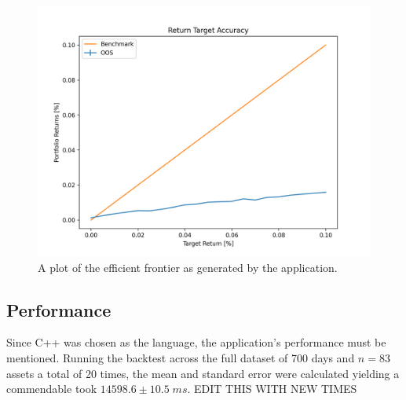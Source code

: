 \documentclass{article}
\begin{document}
\begin{figure}[H]
	\centerline{\includegraphics[width=\textwidth]{figures/oos_accuracy.png}}
	\label{oos_accuracy}
	\caption{A plot of the efficient frontier as generated by the application.}
\end{figure}







\subsection{Performance}

Since C++ was chosen as the language, the application's performance must be mentioned. Running the backtest across the full dataset of 700 days and $n=83$ assets a total of 20 times, the mean and standard error were calculated yielding a commendable took $14598.6 \pm 10.5\;ms$. EDIT THIS WITH NEW TIMES
\end{document}
